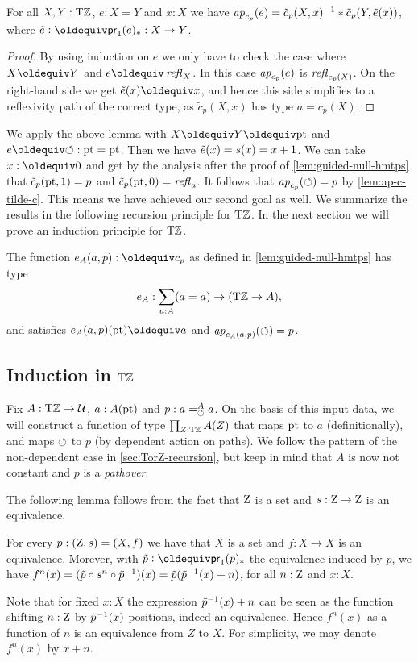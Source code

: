\documentclass[a4,12pt]{amsart}
\begin{document}
\begin{lemma}\label{lem:ap-c-tilde-c}
For all $X,Y:{\mathrm{T}\mathbb{Z}}$, $e: X=Y$ and $x:X$ we have
$\mathop{{\it ap}_{c_p}}(e) = \tilde c_p(X,x)^{-1}* \tilde c_p(Y,\tilde {e}(x))$,
where $\ptoe{e}\defeq \mathsf{pr}_1(e)_* : X\to Y$.
\end{lemma}
\begin{proof}
By using induction on $e$ we only have to check the case where
$X\jdeq Y$ and $e\jdeq\refl{X}$. In this case $\mathop{{\it ap}_{c_p}}(e)$ is
$\mathop{{\it refl}_{c_p(X)}}$. On the right-hand side we get $\ptoe{e}(x)\jdeq x$,
and hence this side simplifies to a reflexivity path of
the correct type, as $\tilde c_p(X,x)$ has type $a=c_p(X)$.
\end{proof}

We apply the above lemma with $X\jdeq Y\jdeq \pt$ and $e\jdeq{\Zloop}: \pt=\pt$.
Then we have $\tilde {e}(x)=s(x)=x+1$. We can take $x\defeq 0$ and get by
the analysis after the proof of \cref{lem:guided-null-hmtps}
that $\tilde c_p({\mathord{\mathrm{pt}}},1) = p$ and $\tilde c_p({\mathord{\mathrm{pt}}},0) = \mathop{{\it refl}_{a}}$.
It follows that $\mathop{{\it ap}_{c_p}}(\circlearrowleft) = p$ by \cref{lem:ap-c-tilde-c}.
This means we have achieved our second goal as well.
We summarize the results in the following recursion principle for ${\mathrm{T}\mathbb{Z}}$.
In the next section we will prove an induction principle for ${\mathrm{T}\mathbb{Z}}$.

\begin{definition}\label{def:TorZrecursor}
The function $e_A(a,p) \defeq c_p$ as defined in 
\cref{lem:guided-null-hmtps} has type
\[
e_A : \sum_{a:A}(a=a) \to ({\mathrm{T}\mathbb{Z}} \to A),
\]
and satisfies $e_A(a,p)(\pt) \jdeq a$ and 
$\mathop{{\it ap}_{e_A(a,p)}}(\circlearrowleft) = p$.
\end{definition}

\subsection{Induction in ${\mathrm{T}\mathbb{Z}}$}\label{sec:TorZ-induction}

Fix $A:{\mathrm{T}\mathbb{Z}}\to\mathcal{U}$, $a:A({\mathord{\mathrm{pt}}})$ and $p: a=^A_{\circlearrowleft} a$.
On the basis of this input data, we will construct a function of 
type $\prod_{Z:{\mathrm{T}\mathbb{Z}}} A(Z)$ that maps ${\mathord{\mathrm{pt}}}$ to $a$ (definitionally),
and maps $\circlearrowleft$ to $p$ (by dependent action on paths).
We follow the pattern of the non-dependent case
in \cref{sec:TorZ-recursion}, but keep in mind that 
$A$ is now not constant and $p$ is a \emph{pathover}.

The following lemma follows from the fact that $\mathrm{Z}$ is a set
and $s: \mathrm{Z}\to\mathrm{Z}$ is an equivalence.
\begin{lemma}\label{lem:paths-in-TorZ}
For every $p: (\mathrm{Z},s)=(X,f)$ we have that $X$ is a set
and $f: X\to X$ is an equivalence.
Morever, with $\ptoe{p}\defeq \mathsf{pr}_1(p)_*$ the equivalence induced by $p$, we have 
$f^n(x) = (\tilde {p}\circ s^n \circ \tilde {p}^{-1})(x) = \tilde {p}(\tilde {p}^{-1}(x)+n)$, 
for all $n:\mathrm{Z}$ and $x:X$.
\end{lemma}
Note that for fixed $x:X$ the expression $\tilde {p}^{-1}(x)+n$ can be seen as 
the function shifting $n:\mathrm{Z}$ by $\tilde {p}^{-1}(x)$ positions, indeed an equivalence.
Hence $f^n(x)$ as a function of $n$ is an equivalence from $Z$ to $X$.
For simplicity, we may denote $f^n(x)$ by $x+n$.
\end{document}
